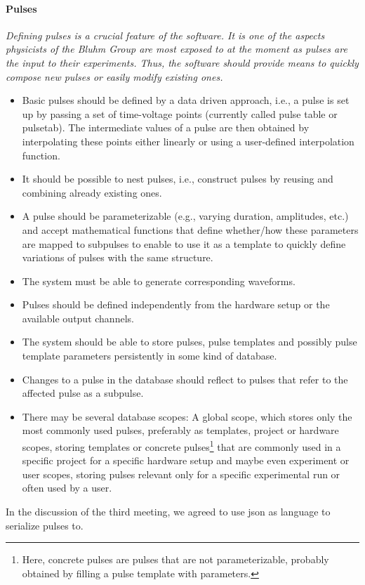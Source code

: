 \documentclass[a4paper,12pt]{article}
\begin{document}
\paragraph{Pulses}
\textit{Defining pulses is a crucial feature of the software. It is one of the aspects physicists of the Bluhm Group are most exposed to at the moment as pulses are the input to their experiments. Thus, the software should provide means to quickly compose new pulses or easily modify existing ones.}
\begin{itemize} \itemsep-0.5pt
 \item Basic pulses should be defined by a data driven approach, i.e., a pulse is set up by passing a set of time-voltage points (currently called pulse table or pulsetab). The intermediate values of a pulse are then obtained by interpolating these points either linearly or using a user-defined interpolation function.
 \item It should be possible to nest pulses, i.e., construct pulses by reusing and combining already existing ones.
 \item A pulse should be parameterizable (e.g., varying duration, amplitudes, etc.) and accept mathematical functions that define whether/how these parameters are mapped to subpulses to enable to use it as a template to quickly define variations of pulses with the same structure.
 \item The system must be able to generate corresponding waveforms.
 \item Pulses should be defined independently from the hardware setup or the available output channels.
 \item The system should be able to store pulses, pulse templates and possibly pulse template parameters persistently in some kind of database.
 \item Changes to a pulse in the database should reflect to pulses that refer to the affected pulse as a subpulse.
 \item There may be several database scopes: A global scope, which stores only the most commonly used pulses, preferably as templates, project or hardware scopes, storing templates or concrete pulses\footnote{Here, concrete pulses are pulses that are not parameterizable, probably obtained by filling a pulse template with parameters.} that are commonly used in a specific project for a specific hardware setup and maybe even experiment or user scopes, storing pulses relevant only for a specific experimental run or often used by a user.
\end{itemize}
In the discussion of the third meeting, we agreed to use json as language to serialize pulses to.
\end{document}
